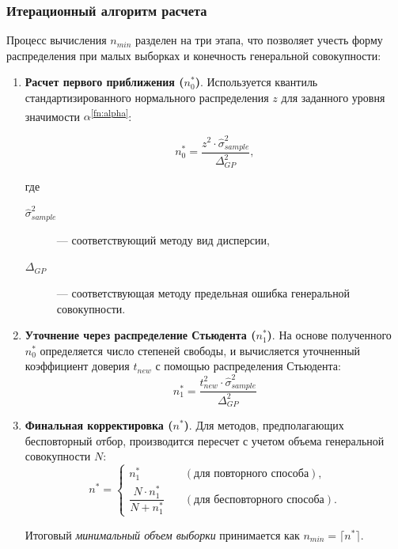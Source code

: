 \hypertarget{algo_target}{\subsubsection*{Итерационный алгоритм расчета}}

Процесс вычисления $n_{min}$ разделен на три этапа, что позволяет
учесть форму распределения при малых выборках и конечность генеральной совокупности:

\begin{enumerate}
    \item \textbf{Расчет первого приближения ($n_0^*$)}.
    Используется квантиль стандартизированного нормального распределения $z$
    для заданного уровня значимости $\alpha$\textsuperscript{\ref{fn:alpha}}:

    \begin{equation}
        \label{eq:n_0}
        n_0^* = \frac{z^2 \cdot \hat{\sigma}_{sample}^2}{\Delta_{GP}^2}  ,
    \end{equation}

    где 
    \begin{description}
        \item[$\hat{\sigma}_{sample}^2$] --- соответствующий методу вид дисперсии, 
        \item[$\Delta_{GP}$] --- соответствующая методу предельная ошибка генеральной совокупности.\footnotemark
    \end{description}
    
    \item \textbf{Уточнение через распределение Стьюдента ($n_1^*$)}.
    На основе полученного $n_0^*$ определяется число степеней свободы, и вычисляется
    уточненный коэффициент доверия $t_{new}$ с помощью распределения Стьюдента:
    \begin{equation}
        \label{eq:n_1}
        n_1^* = \frac{t_{new}^2 \cdot \hat{\sigma}_{sample}^2}{\Delta_{GP}^2}
    \end{equation}

    \item \textbf{Финальная корректировка ($n^*$)}.
    Для методов, предполагающих бесповторный отбор, производится пересчет 
    с учетом объема генеральной совокупности $N$:
    \begin{equation}
        n^* = 
        \begin{cases} 
            n_1^* & \quad (\text{для повторного способа}), \\
            \dfrac{N \cdot n_1^*}{N + n_1^*} & \quad (\text{для бесповторного способа}).
        \end{cases}
    \end{equation}

\noindent Итоговый \textit{минимальный объем выборки} принимается как $n_{min} = \lceil n^* \rceil$.

\end{enumerate}

